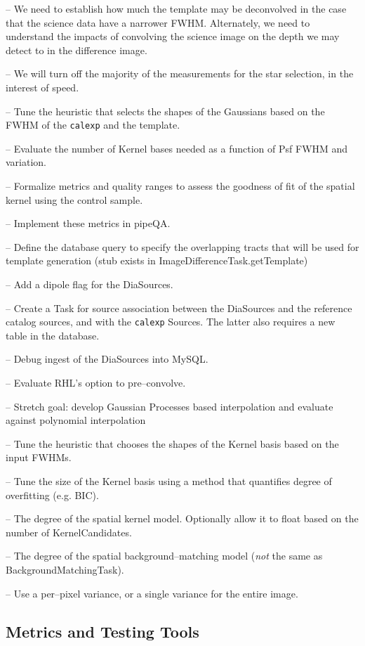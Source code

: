 \documentclass[12pt]{article}
\begin{document}
-- We need to establish how much the template may be deconvolved in
the case that the science data have a narrower FWHM.  Alternately, we
need to understand the impacts of convolving the science image on the
depth we may detect to in the difference image.

-- We will turn off the majority of the measurements for the star
selection, in the interest of speed.

-- Tune the heuristic that selects the shapes of the Gaussians based
on the FWHM of the {\tt calexp} and the template.

-- Evaluate the number of Kernel bases needed as a function of Psf
FWHM and variation.

-- Formalize metrics and quality ranges to assess the goodness of fit
of the spatial kernel using the control sample.

-- Implement these metrics in pipeQA.

-- Define the database query to specify the overlapping tracts that
will be used for template generation (stub exists in
ImageDifferenceTask.getTemplate)

-- Add a dipole flag for the DiaSources.

-- Create a Task for source association between the DiaSources and the
reference catalog sources, and with the {\tt calexp} Sources.  The
latter also requires a new table in the database.

-- Debug ingest of the DiaSources into MySQL.

-- Evaluate RHL's option to pre--convolve.

-- Stretch goal: develop Gaussian Processes based interpolation and
evaluate against polynomial interpolation

-- Tune the heuristic that chooses the shapes of the Kernel basis
based on the input FWHMs.

-- Tune the size of the Kernel basis using a method that quantifies
degree of overfitting (e.g. BIC).

-- The degree of the spatial kernel model.  Optionally allow it to
float based on the number of KernelCandidates.

-- The degree of the spatial background--matching model ({\it not} the
same as BackgroundMatchingTask).

-- Use a per--pixel variance, or a single variance for the entire
image.

\subsection{Metrics and Testing Tools}
\end{document}
